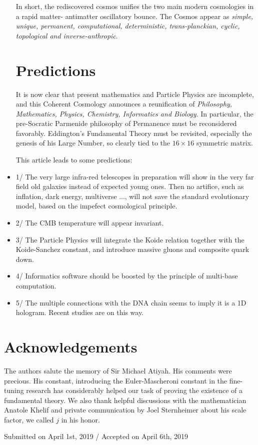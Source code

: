 \documentclass[twoside,draft]{article}
\begin{document}
\begin{sloppypar}
\begin{itemize}
In short, the rediscovered cosmos unifies the two main modern cosmologies in a rapid matter-
antimatter oscillatory bounce. The Cosmos appear as \textit{simple, unique, permanent, computational,
deterministic, trans-planckian, cyclic, topological and inverse-anthropic}.

\section{Predictions}

It is now clear that present mathematics and Particle Physics are incomplete, and this Coherent Cosmology announces a reunification of \textit{Philosophy, Mathematics, Physics, Chemistry, Informatics and Biology}. In particular, the pre-Socratic Parmenide philosophy of Permanence must be reconsidered favorably. Eddington's Fundamental Theory must be revisited, especially the genesis of his Large Number, so clearly tied to the $16 \times 16$ symmetric matrix.

      This article leads to some predictions:
\item 1/  The very large infra-red telescopes in preparation will show in the very far field old galaxies instead of expected young ones. Then no artifice, such as inflation, dark energy, multiverse ..., will not save the standard evolutionary model, based on the impefect cosmological principle.
\item 2/ The CMB temperature will appear invariant. 
\item 3/ The Particle Physics will integrate the Koide relation together with the Koide-Sanchez constant, and introduce massive gluons and composite quark down.
\item 4/ Informatics software should be boosted by the principle of multi-base computation.
\item 5/ The multiple connections with the DNA chain seems to imply it is a 1D hologram. Recent studies \cite{Widom} are on this way. 
\end{itemize}


\section*{Acknowledgements}
The authors salute the memory of Sir Michael Atiyah. His comments were precious. His constant, introducing the Euler-Mascheroni constant in the fine-tuning research has considerably helped our task
of proving the existence of a fundamental theory. We also thank helpful discussions with the 
mathematician Anatole Khelif and private communication by Joel Sternheimer about his scale factor, 
we called $j$ in his honor.
%
\begin{flushright}\footnotesize
Submitted on April 1st, 2019 / Accepted on April 6th, 2019
\end{flushright}



\end{sloppypar}
\end{document}
